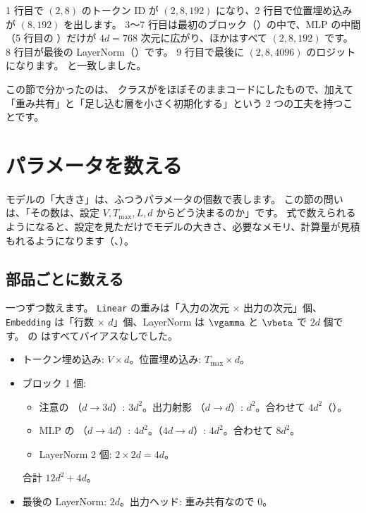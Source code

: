 
1 行目で $(2,8)$ のトークン ID が $(2,8,192)$ になり、2 行目で位置埋め込みが $(8,192)$ を出します。
3〜7 行目は最初のブロック（）の中で、MLP の中間（5 行目の ）だけが $4d=768$ 次元に広がり、ほかはすべて $(2,8,192)$ です。
8 行目が最後の LayerNorm（）です。
9 行目で最後に $(2,8,4096)$ のロジットになります。
と一致しました。

この節で分かったのは、 クラスがをほぼそのままコードにしたもので、加えて「重み共有」と「足し込む層を小さく初期化する」という 2 つの工夫を持つことです。

\section{パラメータを数える}\label{sec:tf-params}

モデルの「大きさ」は、ふつうパラメータの個数で表します。
この節の問いは、「その数は、設定 $V, T_{\max}, L, d$ からどう決まるのか」です。
式で数えられるようになると、設定を見ただけでモデルの大きさ、必要なメモリ、計算量が見積もれるようになります（、）。

\subsection*{部品ごとに数える}

一つずつ数えます。
\texttt{Linear} の重みは「入力の次元 × 出力の次元」個、\texttt{Embedding} は「行数 × $d$」個、LayerNorm は $\vgamma$ と $\vbeta$ で $2d$ 個です。
 の  はすべてバイアスなしでした。

\begin{itemize}
\item トークン埋め込み: $V\times d$。位置埋め込み: $T_{\max}\times d$。
\item ブロック 1 個:
  \begin{itemize}
  \item 注意の （$d\to 3d$）: $3d^2$。出力射影 （$d\to d$）: $d^2$。合わせて $4d^2$（）。
  \item MLP の （$d\to 4d$）: $4d^2$。（$4d\to d$）: $4d^2$。合わせて $8d^2$。
  \item LayerNorm 2 個: $2\times 2d = 4d$。
  \end{itemize}
  合計 $12d^2+4d$。
\item 最後の LayerNorm: $2d$。出力ヘッド: 重み共有なので $0$。
\end{itemize}

